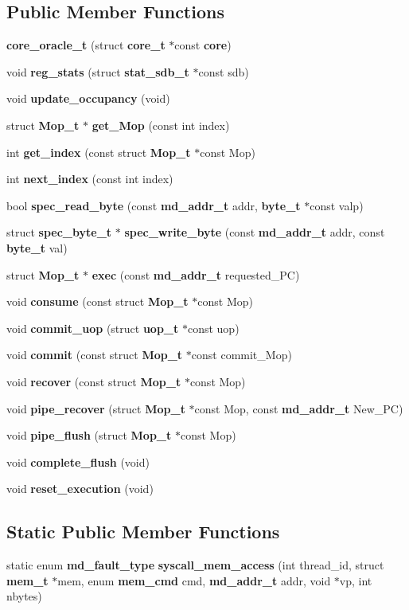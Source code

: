 \subsection*{Public Member Functions}
\begin{CompactItemize}
\item 
{\bf core\_\-oracle\_\-t} (struct {\bf core\_\-t} $\ast$const {\bf core})
\item 
void {\bf reg\_\-stats} (struct {\bf stat\_\-sdb\_\-t} $\ast$const sdb)
\item 
void {\bf update\_\-occupancy} (void)
\item 
struct {\bf Mop\_\-t} $\ast$ {\bf get\_\-Mop} (const int index)
\item 
int {\bf get\_\-index} (const struct {\bf Mop\_\-t} $\ast$const Mop)
\item 
int {\bf next\_\-index} (const int index)
\item 
bool {\bf spec\_\-read\_\-byte} (const {\bf md\_\-addr\_\-t} addr, {\bf byte\_\-t} $\ast$const valp)
\item 
struct {\bf spec\_\-byte\_\-t} $\ast$ {\bf spec\_\-write\_\-byte} (const {\bf md\_\-addr\_\-t} addr, const {\bf byte\_\-t} val)
\item 
struct {\bf Mop\_\-t} $\ast$ {\bf exec} (const {\bf md\_\-addr\_\-t} requested\_\-PC)
\item 
void {\bf consume} (const struct {\bf Mop\_\-t} $\ast$const Mop)
\item 
void {\bf commit\_\-uop} (struct {\bf uop\_\-t} $\ast$const uop)
\item 
void {\bf commit} (const struct {\bf Mop\_\-t} $\ast$const commit\_\-Mop)
\item 
void {\bf recover} (const struct {\bf Mop\_\-t} $\ast$const Mop)
\item 
void {\bf pipe\_\-recover} (struct {\bf Mop\_\-t} $\ast$const Mop, const {\bf md\_\-addr\_\-t} New\_\-PC)
\item 
void {\bf pipe\_\-flush} (struct {\bf Mop\_\-t} $\ast$const Mop)
\item 
void {\bf complete\_\-flush} (void)
\item 
void {\bf reset\_\-execution} (void)
\end{CompactItemize}
\subsection*{Static Public Member Functions}
\begin{CompactItemize}
\item 
static enum {\bf md\_\-fault\_\-type} {\bf syscall\_\-mem\_\-access} (int thread\_\-id, struct {\bf mem\_\-t} $\ast$mem, enum {\bf mem\_\-cmd} cmd, {\bf md\_\-addr\_\-t} addr, void $\ast$vp, int nbytes)
\end{CompactItemize}
